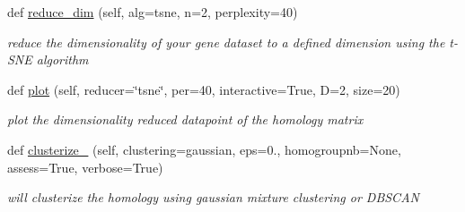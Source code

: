 \begin{DoxyCompactItemize}
def \mbox{\hyperlink{class_py_c_u_b_1_1homology_1_1homology_a3db21ba20b7720362cc19cc5b204eeab}{reduce\+\_\+dim}} (self, alg=\textquotesingle{}tsne\textquotesingle{}, n=2, perplexity=40)
\begin{DoxyCompactList}\small\item\em reduce the dimensionality of your gene dataset to a defined dimension using the t-\/\+S\+NE algorithm \end{DoxyCompactList}\item 
def \mbox{\hyperlink{class_py_c_u_b_1_1homology_1_1homology_a1a3802095c2ea6f426e803b055a2aea9}{plot}} (self, reducer=\char`\"{}tsne\char`\"{}, per=40, interactive=True, D=2, size=20)
\begin{DoxyCompactList}\small\item\em plot the dimensionality reduced datapoint of the homology matrix \end{DoxyCompactList}\item 
def \mbox{\hyperlink{class_py_c_u_b_1_1homology_1_1homology_a7e7748ba85bf571bb04df7a26e2c682c}{clusterize\+\_\+}} (self, clustering=\textquotesingle{}gaussian\textquotesingle{}, eps=0., homogroupnb=None, assess=True, verbose=True)
\begin{DoxyCompactList}\small\item\em will clusterize the homology using gaussian mixture clustering or D\+B\+S\+C\+AN \end{DoxyCompactList}\end{DoxyCompactItemize}
